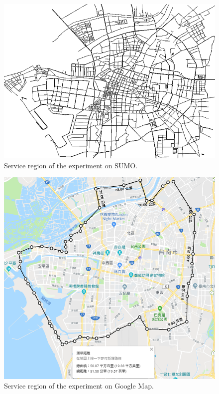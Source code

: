 \documentclass[12pt]{ksthesis}
\begin{document}
\begin{thesis}
{\begin{figure}[H]
\centering
\includegraphics[width=1.0\textwidth]{./Thesis_figures/F7-2_SUMOMap.PNG}
\caption{\large  Service region of the experiment on SUMO.}
\vspace{0.5cm}
\label{Fig:SUMOMap}
\end{figure}

\begin{figure}[H]
\centering
\includegraphics[width=1.0\textwidth]{./Thesis_figures/F7-3_GoogleMap.PNG}
\caption{\large Service region of the experiment on Google Map.}
\vspace{0.5cm}
\label{Fig:GoogleMap}
\end{figure}

}
\end{thesis}
\end{document}
